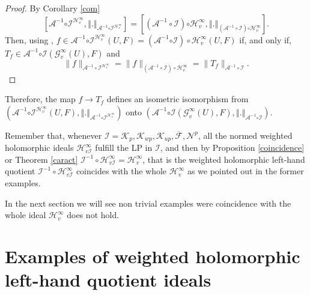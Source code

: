 \documentclass[12pt]{amsart}
\theoremstyle{plain}
\numberwithin{equation}{section}
\begin{document}
\begin{proof}
By Corollary \ref{com} 
\begin{equation*}
\left[ \mathcal{A}^{-1}\mathcal{\circ I}^{\mathcal{H}_{v}^{\infty
}},\left\Vert .\right\Vert _{\mathcal{A}^{-1}\mathcal{\circ I}^{\mathcal{H}%
_{v}^{\infty }}}\right] =\left[ \left( \mathcal{A}^{-1}\circ \mathcal{I}%
\right) \mathcal{\circ H}_{v}^{\infty },\left\Vert .\right\Vert _{\left( 
\mathcal{A}^{-1}\circ \mathcal{I}\right) \mathcal{\circ H}_{v}^{\infty }}%
\right] .
\end{equation*}
Then, using \cite[Theorem 2.7]{CaJiKe}, $f\in \mathcal{A}^{-1}\mathcal{\circ I}^{\mathcal{H}_{v}^{\infty
}}\left( U,F\right)=  (\mathcal{A}^{-1}\mathcal{\circ I})\circ {\mathcal{H}_{v}^{\infty
}}\left( U,F\right)$ 
if, and only if, $T_{f}\in \mathcal{A}^{-1}\mathcal{\circ I}\left( \mathcal{G}%
_{v}^{\infty }(U),F\right) $ and
$$
\|f\|_{\mathcal A^{-1}\circ \mathcal I^{\mathcal H_v^\infty}}=\| f\|_{(\mathcal A^{-1}\circ \mathcal I)\circ \mathcal H_v^\infty}=\|T_f\|_{\mathcal A^{-1}\circ \mathcal I}.
$$
\end{proof}

Therefore, the  map $f\to T_{f}$ defines an isometric
isomorphism from $\left( \mathcal{A}^{-1}\mathcal{\circ I}^{\mathcal{H}%
_{v}^{\infty }}\left( U,F\right) ,\left\Vert .\right\Vert _{\mathcal{A}^{-1}%
\mathcal{\circ I}^{\mathcal{H}_{v}^{\infty }}}\right) $ onto $\left( 
\mathcal{A}^{-1}\mathcal{\circ I}\left( \mathcal{G}_{v}^{\infty
}(U),F\right) ,\left\Vert .\right\Vert _{\mathcal{A}^{-1}\mathcal{\circ I}%
}\right) .$

Remember that, whenever $\mathcal I= \mathcal K_p, \mathcal K_{wp}, \mathcal K_{up},  \overline{\mathcal F}, \mathcal N^p$, all the normed weighted holomorphic ideals $\mathcal H_{v \mathcal I }^\infty$ fulfill the LP in $\mathcal  I$, and then by Proposition \ref{coincidence} or Theorem \ref{caract} $\mathcal I^{-1}\circ \mathcal H_{v\mathcal I}^\infty=\mathcal H_v^\infty$, that is the weighted holomorphic left-hand quotient  $\mathcal I^{-1}\circ \mathcal H_{v\mathcal I}^\infty$ coincides with the whole $\mathcal H_v^\infty$ as we pointed out in the former examples. 

In the next section we will see non trivial examples were  coincidence with the whole ideal $\mathcal H_v^\infty$ does not hold. 

\section{Examples of weighted holomorphic left-hand quotient ideals}\label{sec}
\end{document}

